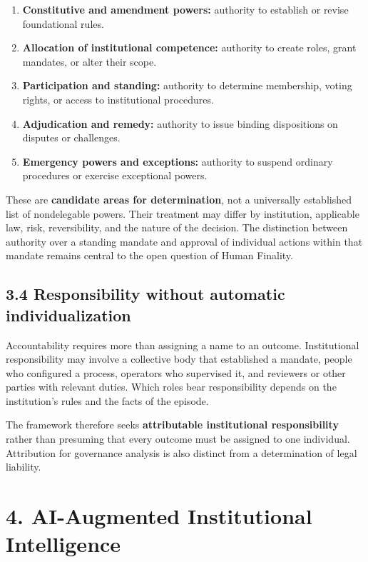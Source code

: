 \documentclass[
  10pt,
]{article}
\providecommand{\tightlist}{%
  \setlength{\itemsep}{0pt}\setlength{\parskip}{0pt}}
\begin{document}
\begin{enumerate}
\def\labelenumi{\arabic{enumi}.}
\tightlist
\item
  \textbf{Constitutive and amendment powers:} authority to establish or
  revise foundational rules.
\item
  \textbf{Allocation of institutional competence:} authority to create
  roles, grant mandates, or alter their scope.
\item
  \textbf{Participation and standing:} authority to determine
  membership, voting rights, or access to institutional procedures.
\item
  \textbf{Adjudication and remedy:} authority to issue binding
  dispositions on disputes or challenges.
\item
  \textbf{Emergency powers and exceptions:} authority to suspend
  ordinary procedures or exercise exceptional powers.
\end{enumerate}

These are \textbf{candidate areas for determination}, not a universally
established list of nondelegable powers. Their treatment may differ by
institution, applicable law, risk, reversibility, and the nature of the
decision. The distinction between authority over a standing mandate and
approval of individual actions within that mandate remains central to
the open question of Human Finality.

\subsection{3.4 Responsibility without automatic
individualization}\label{responsibility-without-automatic-individualization}

Accountability requires more than assigning a name to an outcome.
Institutional responsibility may involve a collective body that
established a mandate, people who configured a process, operators who
supervised it, and reviewers or other parties with relevant duties.
Which roles bear responsibility depends on the institution's rules and
the facts of the episode.

The framework therefore seeks \textbf{attributable institutional
responsibility} rather than presuming that every outcome must be
assigned to one individual. Attribution for governance analysis is also
distinct from a determination of legal liability.

\section{4. AI-Augmented Institutional
Intelligence}\label{ai-augmented-institutional-intelligence}
\end{document}
